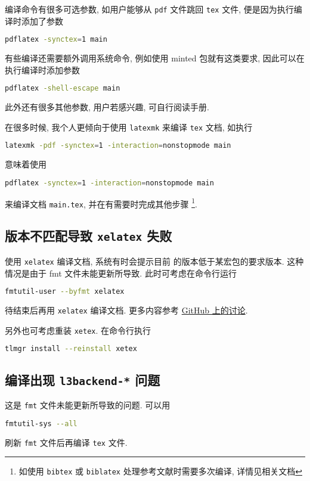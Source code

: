 编译命令有很多可选参数, 如用户能够从 \texttt{pdf} 文件跳回 \texttt{tex} 文件,
便是因为执行编译时添加了参数
\begin{lstlisting}[language=bash]
  pdflatex -synctex=1 main
\end{lstlisting}
有些编译还需要额外调用系统命令,
例如使用 \textsf{minted} 包就有这类要求,
因此可以在执行编译时添加参数
\begin{lstlisting}[language=bash]
  pdflatex -shell-escape main
\end{lstlisting}
此外还有很多其他参数, 用户若感兴趣, 可自行阅读手册. 

在很多时候, 我个人更倾向于使用 \texttt{latexmk} 来编译 \texttt{tex} 文档,
如执行
\begin{lstlisting}[language=bash]
  latexmk -pdf -synctex=1 -interaction=nonstopmode main
\end{lstlisting}
意味着使用 
\begin{lstlisting}[language=bash]
  pdflatex -synctex=1 -interaction=nonstopmode main
\end{lstlisting}
来编译文档 \texttt{main.tex}, 并在有需要时完成其他步骤%
\footnote{如使用 \texttt{bibtex} 或 \texttt{biblatex} 处理参考文献时需要多次编译,
详情见相关文档}. 

\subsection{\LaTeXe 版本不匹配导致 \texttt{xelatex} 失败}

使用 \texttt{xelatex} 编译文档,
系统有时会提示目前 \LaTeXe 的版本低于某宏包的要求版本.
这种情况是由于 \textsf{fmt} 文件未能更新所导致.
此时可考虑在命令行运行
\begin{lstlisting}[language=bash]
  fmtutil-user --byfmt xelatex
\end{lstlisting}
待结束后再用 \texttt{xelatex} 编译文档.
更多内容参考
\href{https://github.com/CTeX-org/forum/issues/70}{GitHub 上的讨论}.

另外也可考虑重装 \texttt{xetex}.
在命令行执行
\begin{lstlisting}[language=bash]
  tlmgr install --reinstall xetex
\end{lstlisting}

\subsection{编译出现 \texttt{l3backend-*} 问题}

这是 \texttt{fmt} 文件未能更新所导致的问题.
可以用
\begin{lstlisting}[language=bash]
  fmtutil-sys --all
\end{lstlisting}
刷新 \texttt{fmt} 文件后再编译 \texttt{tex} 文件.

